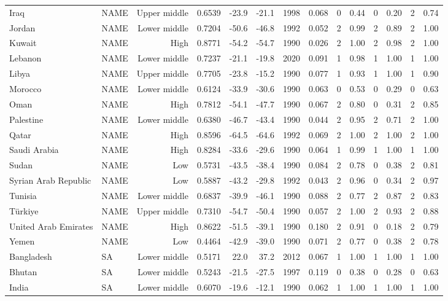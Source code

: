 \begin{longtable}{llrrrrrrrrrrrr}
Iraq & NAME & Upper middle & 0.6539 & -23.9 & -21.1 & 1998 & 0.068 & 0 & 0.44 & 0 & 0.20 & 2 & 0.74 \\
Jordan & NAME & Lower middle & 0.7204 & -50.6 & -46.8 & 1992 & 0.052 & 2 & 0.99 & 2 & 0.89 & 2 & 1.00 \\
Kuwait & NAME & High & 0.8771 & -54.2 & -54.7 & 1990 & 0.026 & 2 & 1.00 & 2 & 0.98 & 2 & 1.00 \\
Lebanon & NAME & Lower middle & 0.7237 & -21.1 & -19.8 & 2020 & 0.091 & 1 & 0.98 & 1 & 1.00 & 1 & 1.00 \\
Libya & NAME & Upper middle & 0.7705 & -23.8 & -15.2 & 1990 & 0.077 & 1 & 0.93 & 1 & 1.00 & 1 & 0.90 \\
Morocco & NAME & Lower middle & 0.6124 & -33.9 & -30.6 & 1990 & 0.063 & 0 & 0.53 & 0 & 0.29 & 0 & 0.63 \\
Oman & NAME & High & 0.7812 & -54.1 & -47.7 & 1990 & 0.067 & 2 & 0.80 & 0 & 0.31 & 2 & 0.85 \\
Palestine & NAME & Lower middle & 0.6380 & -46.7 & -43.4 & 1990 & 0.044 & 2 & 0.95 & 2 & 0.71 & 2 & 1.00 \\
Qatar & NAME & High & 0.8596 & -64.5 & -64.6 & 1992 & 0.069 & 2 & 1.00 & 2 & 1.00 & 2 & 1.00 \\
Saudi Arabia & NAME & High & 0.8284 & -33.6 & -29.6 & 1990 & 0.064 & 1 & 0.99 & 1 & 1.00 & 1 & 1.00 \\
Sudan & NAME & Low & 0.5731 & -43.5 & -38.4 & 1990 & 0.084 & 2 & 0.78 & 0 & 0.38 & 2 & 0.81 \\
Syrian Arab Republic & NAME & Low & 0.5887 & -43.2 & -29.8 & 1992 & 0.043 & 2 & 0.96 & 0 & 0.34 & 2 & 0.97 \\
Tunisia & NAME & Lower middle & 0.6837 & -39.9 & -46.1 & 1990 & 0.088 & 2 & 0.77 & 2 & 0.87 & 2 & 0.83 \\
Türkiye & NAME & Upper middle & 0.7310 & -54.7 & -50.4 & 1990 & 0.057 & 2 & 1.00 & 2 & 0.93 & 2 & 0.88 \\
United Arab Emirates & NAME & High & 0.8622 & -51.5 & -39.1 & 1990 & 0.180 & 2 & 0.91 & 0 & 0.18 & 2 & 0.79 \\
Yemen & NAME & Low & 0.4464 & -42.9 & -39.0 & 1990 & 0.071 & 2 & 0.77 & 0 & 0.38 & 2 & 0.78 \\
Bangladesh & SA & Lower middle & 0.5171 &  22.0 &  37.2 & 2012 & 0.067 & 1 & 1.00 & 1 & 1.00 & 1 & 1.00 \\
Bhutan & SA & Lower middle & 0.5243 & -21.5 & -27.5 & 1997 & 0.119 & 0 & 0.38 & 0 & 0.28 & 0 & 0.63 \\
India & SA & Lower middle & 0.6070 & -19.6 & -12.1 & 1990 & 0.062 & 1 & 1.00 & 1 & 1.00 & 1 & 1.00 \\

\end{longtable}
